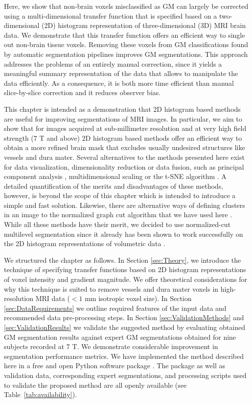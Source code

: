 Here, we show that non-brain voxels misclassified as GM can largely be corrected using a multi-dimensional transfer function that is specified based on a two-dimensional (2D) histogram representation \parencite{Kindlmann1998, Kniss2001, Kniss2005, Ip2012} of three-dimensional (3D) MRI brain data. We demonstrate that this transfer function offers an efficient way to single out non-brain tissue voxels. Removing these voxels from GM classifications found by automatic segmentation pipelines improves GM segmentations. This approach addresses the problems of an entirely manual correction, since it yields a meaningful summary representation of the data that allows to manipulate the data efficiently. As a consequence, it is both more time efficient than manual slice-by-slice correction and it reduces observer bias.

This chapter is intended as a demonstration that 2D histogram based methods are useful for improving segmentations of MRI images. In particular, we aim to show that for images acquired at sub-millimetre resolution and at very high field strength (7 T and above) 2D histogram based methods offer an efficient way to obtain a more refined brain mask that excludes usually undesired structures like vessels and dura mater. Several alternatives to the methods presented here exist for data visualization, dimensionality reduction or data fusion, such as principal component analysis \parencite{PCA2002}, multidimensional scaling \parencite{MDS2005} or the t-SNE algorithm \parencite{VanDerMaaten2008}. A detailed quantification of the merits and disadvantages of these methods, however, is beyond the scope of this chapter which is intended to introduce a simple and fast solution. Likewise, there are alternative ways of defining clusters in an image to the normalized graph cut algorithm that we have used here \parencite{Venkataraju2009, Jain2011, Liu2012, NunezIglesias2013}. While all these methods have their merit, we decided to use normalized-cut multilevel segmentation since it already has been shown to work successfully on the 2D histogram representations of volumetric data \parencite{Ip2012}.

We structured the chapter as follows. In Section \ref{sec:Theory}, we introduce the technique of specifying transfer functions based on 2D histogram representations of voxel intensity and gradient magnitude. We offer theoretical considerations for why this technique is suited to remove vessels and dura mater voxels in high-resolution MRI data ($< 1$ mm isotropic voxel size). In Section \ref{sec:DataRequirements} we outline required features of the input data and recommended data pre-processing steps. In Section \ref{sec:ValidationMethods} and \ref{sec:ValidationResults} we validate the suggested method by evaluating obtained GM segmentation results against expert GM segmentations obtained for nine subjects recorded at 7 T. We demonstrate considerable improvement in segmentation performance metrics. We have implemented the method described here in a free and open Python software package \parencite{segmentator_v1.5.0}. The package as well as validation data, corresponding expert segmentations, and processing scripts used to validate the proposed method are all openly available (see Table~\ref{tab:availability}).

